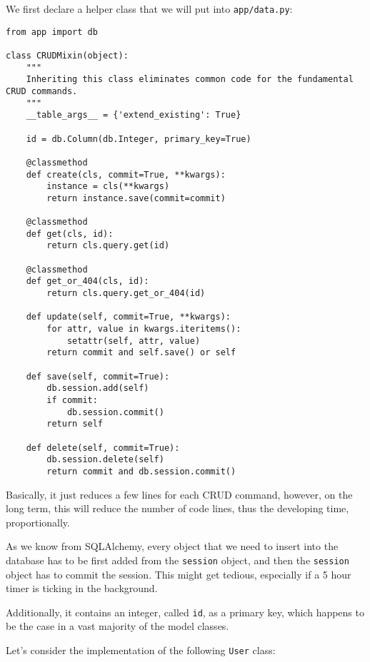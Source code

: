 \documentclass[../main/main.tex]{subfiles}
\begin{document}
We first declare a helper class that we will put into
\lstinline|app/data.py|: 

\begin{lstlisting}[caption=app/data.py, label=lst:data.py]
from app import db

class CRUDMixin(object):
    """
    Inheriting this class eliminates common code for the fundamental CRUD commands.
    """
    __table_args__ = {'extend_existing': True}

    id = db.Column(db.Integer, primary_key=True)

    @classmethod
    def create(cls, commit=True, **kwargs):
        instance = cls(**kwargs)
        return instance.save(commit=commit)

    @classmethod
    def get(cls, id):
        return cls.query.get(id)

    @classmethod
    def get_or_404(cls, id):
        return cls.query.get_or_404(id)

    def update(self, commit=True, **kwargs):
        for attr, value in kwargs.iteritems():
            setattr(self, attr, value)
        return commit and self.save() or self

    def save(self, commit=True):
        db.session.add(self)
        if commit:
            db.session.commit()
        return self

    def delete(self, commit=True):
        db.session.delete(self)
        return commit and db.session.commit()  
\end{lstlisting}

Basically, it just reduces a few lines for each CRUD command, however,
on the long term, this will reduce the number of code lines, thus the
developing time, proportionally.

As we know from SQLAlchemy, every object that we need to insert into
the database has to be first added from the \lstinline|session|
object, and then the \lstinline|session| object has to commit the session. This
might get tedious, especially if a 5 hour timer is ticking in the background.

Additionally, it contains an integer, called \lstinline|id|, as a
primary key, which happens to be the case in a vast majority of the
model classes.

Let's consider the implementation of the following \lstinline|User|
class: 
\end{document}
